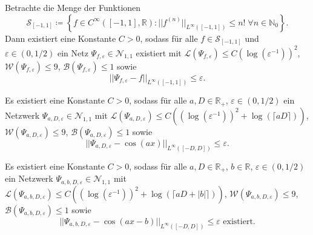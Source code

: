 \documentclass[11pt]{scrartcl}
\newcommand{\N}{\mathbb{N}} %
\newcommand{\R}{\mathbb{R}} %
\begin{document}
\begin{lemma} %
	Betrachte die Menge der Funktionen 
	\[ \mathcal{S}_{[-1,1]} \coloneqq \left\{ f \in C^\infty([-1,1], \R): ||f^{(n)}||_{L^\infty([-1,1])} \leq n! \;\forall n \in \N_0 \right\}. \]
	Dann existiert eine Konstante \(C>0\), sodass für alle \(f\in \mathcal{S}_{[-1,1]}\) und \(\varepsilon\in (0,1/2)\) 
	ein Netz \(\Psi_{f,\varepsilon} \in \mathcal{N}_{1,1}\) existiert mit 
	\( \mathcal{L}(\Psi_{f,\varepsilon}) \leq C(\log(\varepsilon^{-1}))^2 \), 
	\(\mathcal{W}(\Psi_{f,\varepsilon}) \leq 9\), \(\mathcal{B}(\Psi_{f,\varepsilon}) \leq 1\) 
	sowie 
	\[ ||\Psi_{f,\varepsilon} - f||_{L^\infty([-1,1])} \leq \varepsilon. \]
\end{lemma}

\begin{theorem} %
	\newcommand{\Psia}{\Psi_{a,D,\varepsilon}}
	Es existiert eine Konstante \(C>0\), sodass für alle \(a,D\in \R_+\), \(\varepsilon \in (0,1/2)\) 
	ein Netzwerk \(\Psia \in \mathcal{N}_{1,1}\) mit \(\mathcal{L}(\Psia) \leq C((\log(\varepsilon^{-1}))^2 + \log(\lceil aD\rceil))\), 
	\(\mathcal{W}(\Psia) \leq 9\), \(\mathcal{B}(\Psia) \leq 1\) sowie 
	\[ ||\Psia - \cos(a x) ||_{L^{\infty}([-D,D])} \leq \varepsilon. \]
\end{theorem}

\begin{corollary} %
	\newcommand{\Psia}{\Psi_{a,b,D,\varepsilon}}
	Es existiert eine Konstante \(C>0\), sodass für alle \(a,D\in \R_+\), \(b\in \R\), \(\varepsilon \in (0,1/2)\) 
	ein Netzwerk \(\Psia \in \mathcal{N}_{1,1} \) mit 
	\(\mathcal{L}(\Psia) \leq C((\log(\varepsilon^{-1}))^2 + \log(\lceil a D + |b| \rceil))\), 
	\(\mathcal{W}(\Psia) \leq 9\), \(\mathcal{B}(\Psia) \leq 1\) sowie 
	\[ ||\Psia - \cos(a x - b) ||_{L^\infty([-D,D])} \leq \varepsilon \text{ existiert}. \]
\end{corollary}

\nocite{Grohs2019}
\printbibliography{}
\end{document}
